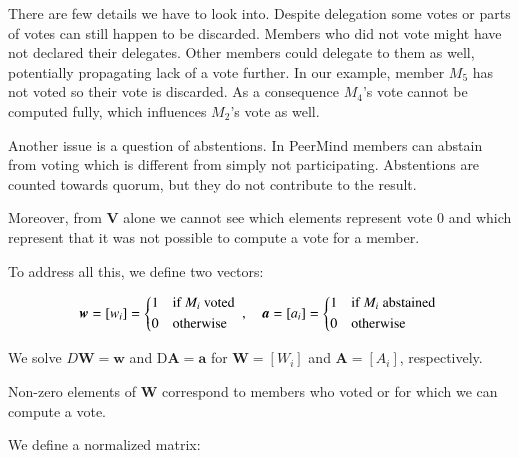 \documentclass{sigchi}
\begin{document}
There are few details we have to look into.
Despite delegation some votes or parts of votes can still happen to be discarded.
Members who did not vote might have not declared their delegates.
Other members could delegate to them as well, potentially propagating lack of a vote further.
In our example, member $M_5$ has not voted so their vote is discarded.
As a consequence $M_4$'s vote cannot be computed fully, which influences $M_2$'s vote as well.

Another issue is a question of abstentions.
In PeerMind members can abstain from voting which is different from simply not participating.
Abstentions are counted towards quorum, but they do not contribute to the result.

Moreover, from $\boldsymbol{V}$ alone we cannot see which elements represent vote $0$ and which
represent that it was not possible to compute a vote for a member.

To address all this, we define two vectors:

\begin{displaymath}
\boldsymbol{w} = \left[w_i\right] = \begin{dcases*}
 1 & if $M_i$ voted \\
 0 & otherwise \\
\end{dcases*},\quad \boldsymbol{a} = \left[a_i\right] = \begin{dcases*}
 1 & if $M_i$ abstained \\
 0 & otherwise \\
\end{dcases*}
\end{displaymath}

We solve $D \boldsymbol{W} = \boldsymbol{w}$ and $\mathrm{D} \boldsymbol{A} = \boldsymbol{a}$ for
$\boldsymbol{W} = \left[W_{i}\right]$ and $\boldsymbol{A} = \left[A_{i}\right]$, respectively.

Non-zero elements of $\boldsymbol{W}$ correspond to members who voted or for which we can compute
a vote.


We define a normalized matrix:
\end{document}
